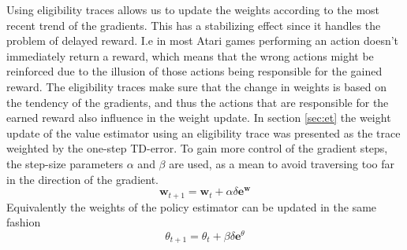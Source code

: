 \documentclass[11pt]{article}
\begin{document}
Using eligibility traces allows us to update the weights
according to the most recent trend of the gradients.
This has a stabilizing effect since it handles the problem of delayed reward.
I.e in most Atari games performing an action doesn't immediately return a reward,
which means that the wrong actions might be reinforced due to the illusion
of those actions being responsible for the gained reward.
The eligibility traces make sure that the change in weights is based on the
tendency of the gradients, and thus the actions that are responsible
for the earned reward also influence in the weight update.
In section \ref{sec:et} the weight update of the value estimator
using an eligibility trace was presented as the trace weighted by
the one-step TD-error.
To gain more control of the gradient steps, the step-size parameters $\alpha$ and $\beta$ are used,
as a mean to avoid traversing too far in the direction of the gradient.
\begin{equation*}
    \mathbf{w}_{t+1}= \mathbf{w}_t + \alpha \delta \mathbf{e}^{\mathbf{w}}
\end{equation*}
Equivalently the weights of the policy estimator can be updated in the same fashion
\begin{equation}
    \theta_{t+1} = \theta_t + \beta \delta \mathbf{e}^\theta
\end{equation}


%
%
\end{document}
